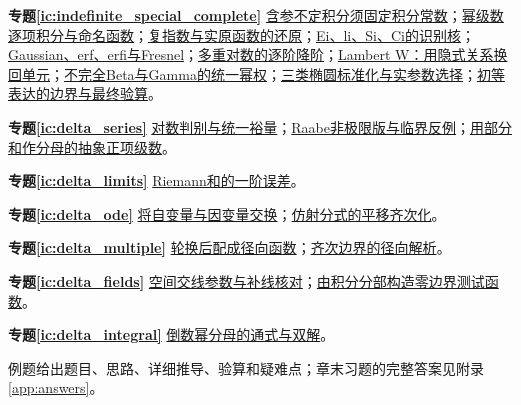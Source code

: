 \par\noindent\textbf{专题\ref{ic:indefinite_special_complete}}\quad 
\hyperref[ic:indefinite_special_complete:parameter]{含参不定积分须固定积分常数}；\hyperref[ic:indefinite_special_complete:series]{幂级数逐项积分与命名函数}；\hyperref[ic:indefinite_special_complete:complex]{复指数与实原函数的还原}；\hyperref[ic:indefinite_special_complete:ei]{Ei、li、Si、Ci的识别核}；\hyperref[ic:indefinite_special_complete:gauss]{Gaussian、erf、erfi与Fresnel}；\hyperref[ic:indefinite_special_complete:polylog]{多重对数的逐阶降阶}；\hyperref[ic:indefinite_special_complete:lambert]{Lambert W：用隐式关系换回单元}；\hyperref[ic:indefinite_special_complete:incomplete]{不完全Beta与Gamma的统一幂权}；\hyperref[ic:indefinite_special_complete:elliptic]{三类椭圆标准化与实参数选择}；\hyperref[ic:indefinite_special_complete:boundary]{初等表达的边界与最终验算}。\par
\par\noindent\textbf{专题\ref{ic:delta_series}}\quad 
\hyperref[ic:delta_series:logtest]{对数判别与统一裕量}；\hyperref[ic:delta_series:raabemargin]{Raabe非极限版与临界反例}；\hyperref[ic:delta_series:partialsums]{用部分和作分母的抽象正项级数}。\par
\par\noindent\textbf{专题\ref{ic:delta_limits}}\quad 
\hyperref[ic:delta_limits:riemannerror]{Riemann和的一阶误差}。\par
\par\noindent\textbf{专题\ref{ic:delta_ode}}\quad 
\hyperref[ic:delta_ode:invert]{将自变量与因变量交换}；\hyperref[ic:delta_ode:affine]{仿射分式的平移齐次化}。\par
\par\noindent\textbf{专题\ref{ic:delta_multiple}}\quad 
\hyperref[ic:delta_multiple:permutationpair]{轮换后配成径向函数}；\hyperref[ic:delta_multiple:homogeneousboundary]{齐次边界的径向解析}。\par
\par\noindent\textbf{专题\ref{ic:delta_fields}}\quad 
\hyperref[ic:delta_fields:spaceorientation]{空间交线参数与补线核对}；\hyperref[ic:delta_fields:testfunction]{由积分分部构造零边界测试函数}。\par
\par\noindent\textbf{专题\ref{ic:delta_integral}}\quad 
\hyperref[ic:delta_integral:reciprocalpower]{倒数幂分母的通式与双解}。\par
例题给出题目、思路、详细推导、验算和疑难点；章末习题的完整答案见附录\ref{app:answers}。

